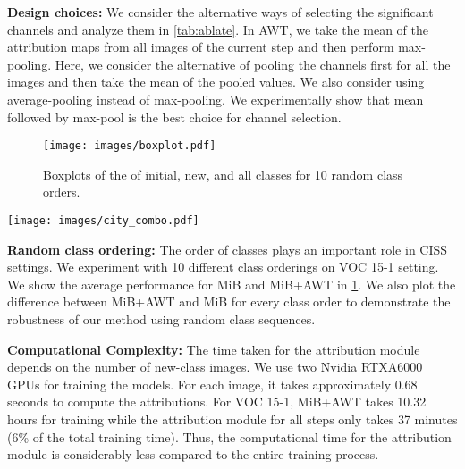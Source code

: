 \noindent\textbf{Design choices:} We consider the alternative ways of selecting the significant channels and analyze them in \cref{tab:ablate}. In AWT, we take the mean of the attribution maps from all images of the current step and then perform max-pooling. Here, we consider the alternative of pooling the channels first for all the images and then take the mean of the pooled values. We also consider using average-pooling instead of max-pooling. We experimentally show that mean followed by max-pool is the best choice for channel selection.



\begin{figure}[t]
\centering
\texttt{[image: images/boxplot.pdf]}
\caption{Boxplots of the \miou{} of initial, new, and all classes for 10 random class orders.}
\label{fig:boxplot}
\end{figure}

\begin{figure*}[t]
\texttt{[image: images/city\_combo.pdf]}
    \caption{Visualization of predictions using MiB and MiB+AWT in 14-1 setting for Cityscapes. MiB is highly biased towards the new classes and classifies the \emph{bus} as \emph{train} (row 1) while MiB+AWT correctly classifies the \emph{bus} (row 2).}
    \label{fig:combo2}
\end{figure*}

\noindent\textbf{Random class ordering:} The order of classes plays an important role in CISS settings. We experiment with 10 different class orderings on VOC 15-1 setting. We show the average performance for MiB and MiB+AWT in \cref{fig:boxplot}. We also plot the difference between MiB+AWT and MiB for every class order to demonstrate the robustness of our method using random class sequences.

\noindent\textbf{Computational Complexity:} The time taken for the attribution module depends on the number of new-class images. We use two Nvidia RTXA6000 GPUs for training the models. For each image, it takes approximately 0.68 seconds to compute the attributions.
For VOC 15-1, MiB+AWT takes 10.32 hours for training while the attribution module for all steps only takes 37 minutes (6\% of the total training time). Thus, the computational time for the attribution module is considerably less compared to the entire training process.

